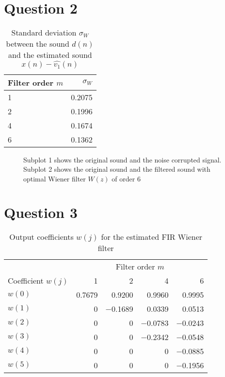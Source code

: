 \documentclass[12pt,a4paper]{article}
\begin{document}
\clearpage\section*{Question 2}

\begin{table}[h!]
\centering
\caption{Standard deviation $\sigma_{W}$ between the sound $d(n)$ and the estimated sound $x(n) - \hat{v_{1}}(n)$}
\begin{tabular}{l | r}
Filter order $m$ & $\sigma_{W}$ \\
\hline
\num{1} & \num{0.2075}\\
\num{2} & \num{0.1996}\\
\num{4} & \num{0.1674}\\
\num{6} & \num{0.1362}\\
\hline
\end{tabular}
\end{table}

\begin{figure}[h!]
\centering

\caption{Subplot 1 shows the original sound and the noise corrupted signal. Subplot 2 shows the original sound and the filtered sound with optimal Wiener filter $W(z)$ of order \num{6}}
\end{figure}

\clearpage\section*{Question 3}

\begin{table}[h!]
\centering
\caption{Output coefficients $w(j)$ for the estimated FIR Wiener filter}
\begin{tabular}{l r r r r}
\hline
 & \multicolumn{4}{c}{Filter order $m$}\\
 \cline{2-5}
Coefficient $w(j)$ & \num{1} & \num{2} & \num{4} & \num{6} \\
\hline
$w(0)$ & \num{0.7679} & \num{0.9200}& \num{0.9960} & \num{0.9995} \\
$w(1)$ & \num{0} & \num{-0.1689}& \num{0.0339}& \num{0.0513} \\
$w(2)$ & \num{0}& \num{0}& \num{-0.0783}& \num{-0.0243}\\
$w(3)$ & \num{0}& \num{0}& \num{-0.2342}& \num{-0.0548}\\
$w(4)$ & \num{0}& \num{0}& \num{0}& \num{-0.0885}\\
$w(5)$ & \num{0}& \num{0}& \num{0}& \num{-0.1956}\\
\hline
\end{tabular}
\end{table}
\end{document}
